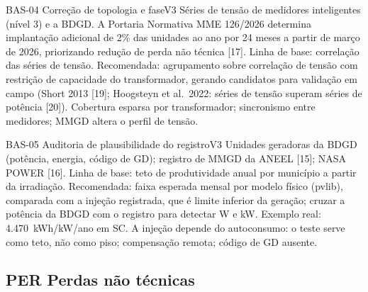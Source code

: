 \begin{ficha}{BAS-04 \textperiodcentered{} Correção de topologia e fase}{V3}
 Séries de tensão de medidores inteligentes (nível 3) e a BDGD.
A Portaria Normativa MME 126/2026 determina implantação adicional de 2\% das
unidades ao ano por 24 meses a partir de março de 2026, priorizando redução
de perda não técnica [17].
 Linha de base: correlação das séries de tensão.
Recomendada: agrupamento sobre correlação de tensão com restrição de
capacidade do transformador, gerando candidatos para validação em campo
(Short 2013 [19]; Hoogsteyn et al.\ 2022: séries de tensão superam
séries de potência [20]).
 Cobertura esparsa por transformador; sincronismo entre
medidores; MMGD altera o perfil de tensão.
\end{ficha}

\begin{ficha}{BAS-05 \textperiodcentered{} Auditoria de plausibilidade do registro}{V3}
 Unidades geradoras da BDGD (potência, energia, código de GD);
registro de MMGD da ANEEL [15]; NASA POWER [16].
 Linha de base: teto de produtividade anual por município a
partir da irradiação. Recomendada: faixa esperada mensal por modelo físico
(pvlib), comparada com a injeção registrada, que é limite inferior da geração;
cruzar a potência da BDGD com o registro para detectar W e kW. Exemplo real:
4.470~kWh/kW/ano em SC.
 A injeção depende do autoconsumo: o teste serve como teto,
não como piso; compensação remota; código de GD ausente.
\end{ficha}

\subsection{PER \textperiodcentered{} Perdas não técnicas}

